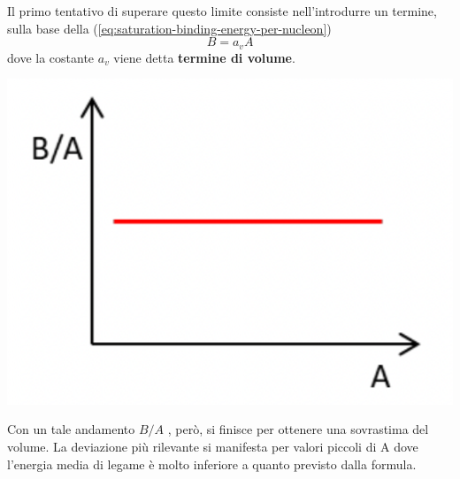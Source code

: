 Il primo tentativo di superare questo limite consiste nell'introdurre un
termine, sulla base della (\ref{eq:saturation-binding-energy-per-nucleon})
\begin{equation}
	B = a_{v} A
   \label{eq:volume-term-drop-model}
\end{equation}
dove la costante \(a_{v}\) viene detta \textbf{termine di volume}.
\begin{marginfigure}
	\includegraphics{figs/goccia1}
	\label{fig:goccia1}
\end{marginfigure}
Con un tale andamento \(B / A\) , però, si finisce per ottenere una sovrastima
del volume.
La deviazione più rilevante si manifesta per valori piccoli di A dove
l'energia media di legame è molto inferiore a quanto previsto dalla
formula.
\bigskip

